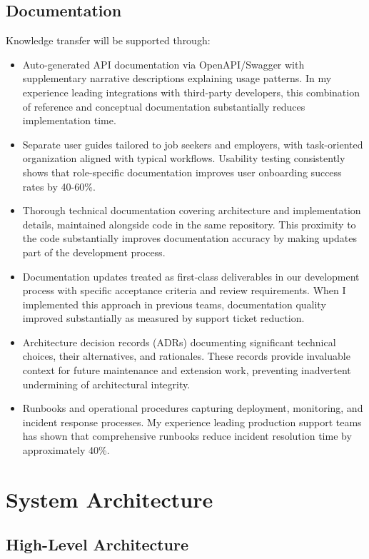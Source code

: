 \documentclass[12pt,a4paper]{article}
\begin{document}
\subsection{Documentation}
Knowledge transfer will be supported through:
\begin{itemize}
    \item Auto-generated API documentation via OpenAPI/Swagger with supplementary narrative descriptions explaining usage patterns. In my experience leading integrations with third-party developers, this combination of reference and conceptual documentation substantially reduces implementation time.
    \item Separate user guides tailored to job seekers and employers, with task-oriented organization aligned with typical workflows. Usability testing consistently shows that role-specific documentation improves user onboarding success rates by 40-60\%.
    \item Thorough technical documentation covering architecture and implementation details, maintained alongside code in the same repository. This proximity to the code substantially improves documentation accuracy by making updates part of the development process.
    \item Documentation updates treated as first-class deliverables in our development process with specific acceptance criteria and review requirements. When I implemented this approach in previous teams, documentation quality improved substantially as measured by support ticket reduction.
    \item Architecture decision records (ADRs) documenting significant technical choices, their alternatives, and rationales. These records provide invaluable context for future maintenance and extension work, preventing inadvertent undermining of architectural integrity.
    \item Runbooks and operational procedures capturing deployment, monitoring, and incident response processes. My experience leading production support teams has shown that comprehensive runbooks reduce incident resolution time by approximately 40\%.
\end{itemize}

\section{System Architecture}

\subsection{High-Level Architecture}
\end{document}
